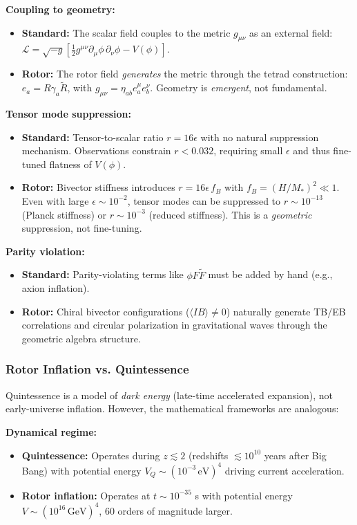 \documentclass[11pt,a4paper]{article}
\numberwithin{equation}{section}
\theoremstyle{plain}
\theoremstyle{definition}
\theoremstyle{remark}
\begin{document}
\textbf{Coupling to geometry:}
\begin{itemize}
  \item \textbf{Standard:} The scalar field couples to the metric $g_{\mu\nu}$ as an external field: $\mathcal{L} = \sqrt{-g}\left[\frac{1}{2}g^{\mu\nu}\partial_\mu\phi\,\partial_\nu\phi - V(\phi)\right]$.
  \item \textbf{Rotor:} The rotor field \emph{generates} the metric through the tetrad construction: $e_a = R\gamma_a\widetilde{R}$, with $g_{\mu\nu} = \eta_{ab}e_a^\mu e_b^\nu$. Geometry is \emph{emergent}, not fundamental.
\end{itemize}

\textbf{Tensor mode suppression:}
\begin{itemize}
  \item \textbf{Standard:} Tensor-to-scalar ratio $r = 16\epsilon$ with no natural suppression mechanism. Observations constrain $r < 0.032$, requiring small $\epsilon$ and thus fine-tuned flatness of $V(\phi)$.
  \item \textbf{Rotor:} Bivector stiffness introduces $r = 16\epsilon\, f_B$ with $f_B = (H/M_*)^2 \ll 1$. Even with large $\epsilon \sim 10^{-2}$, tensor modes can be suppressed to $r \sim 10^{-13}$ (Planck stiffness) or $r \sim 10^{-3}$ (reduced stiffness). This is a \emph{geometric} suppression, not fine-tuning.
\end{itemize}

\textbf{Parity violation:}
\begin{itemize}
  \item \textbf{Standard:} Parity-violating terms like $\phi F\tilde{F}$ must be added by hand (e.g., axion inflation).
  \item \textbf{Rotor:} Chiral bivector configurations ($\langle I B \rangle \neq 0$) naturally generate TB/EB correlations and circular polarization in gravitational waves through the geometric algebra structure.
\end{itemize}

\subsubsection{Rotor Inflation vs. Quintessence}

Quintessence is a model of \emph{dark energy} (late-time accelerated expansion), not early-universe inflation. However, the mathematical frameworks are analogous:

\textbf{Dynamical regime:}
\begin{itemize}
  \item \textbf{Quintessence:} Operates during $z \lesssim 2$ (redshifts $\lesssim 10^{10}$ years after Big Bang) with potential energy $V_Q \sim (10^{-3}\,\mathrm{eV})^4$ driving current acceleration.
  \item \textbf{Rotor inflation:} Operates at $t \sim 10^{-35}$ s with potential energy $V \sim (10^{16}\,\mathrm{GeV})^4$, 60 orders of magnitude larger.
\end{itemize}
\end{document}
